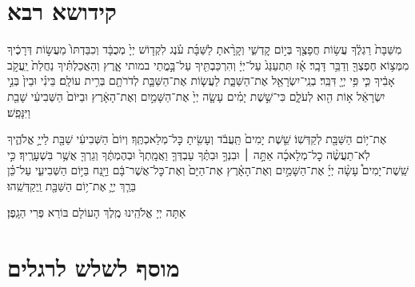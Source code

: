 \documentclass[twoside, openany, parskip=half, 11pt]{book}
\begin{document}
%

\mournerskaddish
\adonolam

\chapter[קידושא רבא לשבת]{ קידושא רבא }

מִשַּׁבָּת֙ רַגְלֶ֔ךָ עֲשׂ֥וֹת חֲפָצֶ֖ךָ בְּי֣וֹם קׇדְשִׁ֑י וְקָרָ֨אתָ לַשַּׁבָּ֜ת עֹ֗נֶג לִקְד֤וֹשׁ יְיָ֙ מְכֻבָּ֔ד וְכִבַּדְתּוֹ֙ מֵעֲשׂ֣וֹת דְּרָכֶ֔יךָ מִמְּצ֥וֹא חֶפְצְךָ֖ וְדַבֵּ֥ר דָּבָֽר׃ אָ֗ז תִּתְעַנַּג֙ עַל־יְיָ֔ וְהִרְכַּבְתִּ֖יךָ עַל־בָּ֣מֳתֵי במותי אָ֑רֶץ וְהַאֲכַלְתִּ֗יךָ נַחֲלַת֙ יַֽעֲקֹ֣ב אָבִ֔יךָ כִּ֛י פִּ֥י יְיָ֖ דִּבֵּֽר׃
בְנֵֽי־יִשְׂרָאֵ֖ל אֶת־הַשַּׁבָּ֑ת לַעֲשׂ֧וֹת אֶת־הַשַּׁבָּ֛ת לְדֹרֹתָ֖ם בְּרִ֥ית עוֹלָֽם׃ בֵּינִ֗י וּבֵין֙ בְּנֵ֣י יִשְׂרָאֵ֔ל א֥וֹת הִ֖וא לְעֹלָ֑ם כִּי־שֵׁ֣שֶׁת יָמִ֗ים עָשָׂ֤ה יְיָ֙ אֶת־הַשָּׁמַ֣יִם וְאֶת־הָאָ֔רֶץ וּבַיּוֹם֙ הַשְּׁבִיעִ֔י שָׁבַ֖ת וַיִּנָּפַֽשׁ׃

אֶת־י֥וֹם הַשַּׁבָּ֖ת לְקַדְּשֽׁוֹ׃ שֵׁ֤שֶׁת יָמִים֙ תַּֽעֲבֹ֔ד וְעָשִׂ֖יתָ כׇּל־מְלַאכְתֶּֽךָ׃ וְיוֹם֙ הַשְּׁבִיעִ֔י שַׁבָּ֖ת לַייָ֣ אֱלֹהֶ֑יךָ לֹֽא־תַעֲשֶׂ֨ה כׇל־מְלָאכָ֜ה אַתָּ֣ה ׀ וּבִנְךָ֣ וּבִתֶּ֗ךָ עַבְדְּךָ֤ וַאֲמָֽתְךָ֙ וּבְהֶמְתֶּ֔ךָ וְגֵרְךָ֖ אֲשֶׁ֥ר בִּשְׁעָרֶֽיךָ׃ כִּ֣י שֵֽׁשֶׁת־יָמִים֩ עָשָׂ֨ה יְיָ֜ אֶת־הַשָּׁמַ֣יִם וְאֶת־הָאָ֗רֶץ אֶת־הַיָּם֙ וְאֶת־כׇּל־אֲשֶׁר־בָּ֔ם וַיָּ֖נַח בַּיּ֣וֹם הַשְּׁבִיעִ֑י עַל־כֵּ֗ן בֵּרַ֧ךְ יְיָ֛ אֶת־י֥וֹם הַשַּׁבָּ֖ת וַֽיְקַדְּשֵֽׁהוּ׃

\savri
{}
אַתָּה יְיָ אֱלֹהֵֽינוּ מֶֽלֶךְ הָעוֹלָם בּוֹרֵא פְּרִי הַגָֽפֶן׃

\chapter[מוסף לשלש רגלים]{ מוסף לשלש לרגלים ‎}
\label{musaphregel}


\specialsaavos

\specialsameisim

\nextpage

\end{document}
